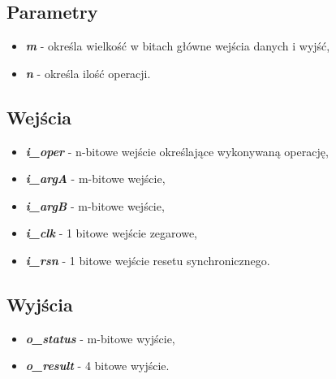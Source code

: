 \subsection{Parametry}
\begin{itemize}
	\item \emph{\textbf{m}} - określa wielkość w bitach główne wejścia danych i wyjść,
	\item \emph{\textbf{n}} - określa ilość operacji.
\end{itemize}

\subsection{Wejścia}

\begin{itemize}
	\item \emph{\textbf{i\_oper}} - n-bitowe wejście określające wykonywaną operację,
	\item \emph{\textbf{i\_argA}} - m-bitowe wejście,
	\item \emph{\textbf{i\_argB}} - m-bitowe wejście,
	\item \emph{\textbf{i\_clk}} - 1 bitowe wejście zegarowe,
	\item \emph{\textbf{i\_rsn}} - 1 bitowe wejście resetu synchronicznego.
\end{itemize}

\subsection{Wyjścia}
\begin{itemize}
	\item \emph{\textbf{o\_status}} - m-bitowe wyjście,
	\item \emph{\textbf{o\_result}} - 4 bitowe wyjście.
\end{itemize}


